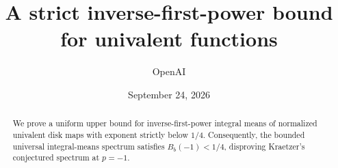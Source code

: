 \documentclass[11pt,a4paper]{article}
\title{A strict inverse-first-power bound for univalent functions}
\author{OpenAI}
\date{September 24, 2026}
\theoremstyle{remark}
\begin{document}
\maketitle
\begin{abstract}
We prove a uniform upper bound for inverse-first-power integral means
of normalized univalent disk maps with exponent strictly below \(1/4\).
Consequently, the bounded universal integral-means spectrum satisfies
\(B_b(-1)<1/4\), disproving Kraetzer's conjectured spectrum at \(p=-1\).
\end{abstract}











\end{document}
